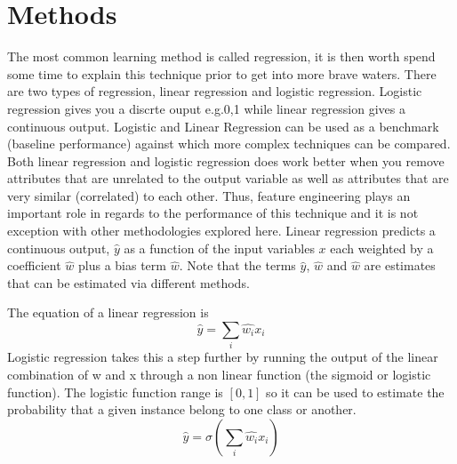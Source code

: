 \documentclass[12pt]{report}
\begin{document}
\section{Methods}
\label{se:me}
The most common learning method is called regression, it is then worth spend some time to explain this technique prior to get into more brave waters. 
There are two types of regression, linear regression and logistic regression. Logistic regression gives you a discrte ouput e.g.0,1 while linear regression gives a continuous output. Logistic and Linear Regression can be used as a benchmark (baseline performance) against which more complex techniques can be compared. 
Both linear regression and logistic regression does work better when you remove attributes that are unrelated to the output variable as well as attributes that are very similar (correlated) to each other. Thus, feature engineering plays an important role in regards to the performance of this technique and it is not exception with other methodologies explored here. 
Linear regression predicts a continuous output, $\hat{y}$ as a function of the input variables $x$ each weighted by a coefficient $\hat{w}$ plus a bias term $\hat{w}$. Note that the terms $\hat{y}$, $\hat{w}$ and $\hat{w}$ are estimates that can be estimated via different methods.

The equation of a linear regression is
\begin{equation}
\hat{y} = \sum_i \hat{w_i}x_i
\end{equation}
Logistic regression takes this a step further by running the output  of the linear combination of w and x through a non linear function (the sigmoid or logistic function). The logistic function range is $[0,1]$ so it can be used to estimate the probability that a given instance belong to one class or another.
\begin{equation}
\hat{y} = \sigma(\sum_i \hat{w_i}x_i)
\end{equation}
\end{document}
